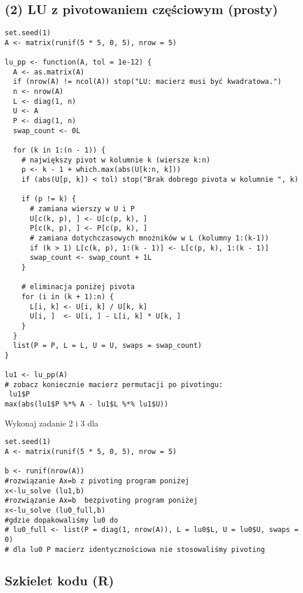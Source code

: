\documentclass[12pt]{article}
\begin{document}
\subsection*{(2) LU z pivotowaniem częściowym (prosty)}
\begin{lstlisting}
set.seed(1)
A <- matrix(runif(5 * 5, 0, 5), nrow = 5)

lu_pp <- function(A, tol = 1e-12) {
  A <- as.matrix(A)
  if (nrow(A) != ncol(A)) stop("LU: macierz musi być kwadratowa.")
  n <- nrow(A)
  L <- diag(1, n)
  U <- A
  P <- diag(1, n)
  swap_count <- 0L

  for (k in 1:(n - 1)) {
    # największy pivot w kolumnie k (wiersze k:n)
    p <- k - 1 + which.max(abs(U[k:n, k]))
    if (abs(U[p, k]) < tol) stop("Brak dobrego pivota w kolumnie ", k)

    if (p != k) {
      # zamiana wierszy w U i P
      U[c(k, p), ] <- U[c(p, k), ]
      P[c(k, p), ] <- P[c(p, k), ]
      # zamiana dotychczasowych mnożników w L (kolumny 1:(k-1))
      if (k > 1) L[c(k, p), 1:(k - 1)] <- L[c(p, k), 1:(k - 1)]
      swap_count <- swap_count + 1L
    }

    # eliminacja poniżej pivota
    for (i in (k + 1):n) {
      L[i, k] <- U[i, k] / U[k, k]
      U[i, ]  <- U[i, ] - L[i, k] * U[k, ]
    }
  }
  list(P = P, L = L, U = U, swaps = swap_count)
}

lu1 <- lu_pp(A)
# zobacz koniecznie macierz permutacji po pivotingu:
 lu1$P
max(abs(lu1$P %*% A - lu1$L %*% lu1$U))
\end{lstlisting}


Wykonaj zadanie 2 i 3 dla
\begin{lstlisting}
set.seed(1)
A <- matrix(runif(5 * 5, 0, 5), nrow = 5)

b <- runif(nrow(A))
#rozwiązanie Ax=b z pivoting program poniżej
x<-lu_solve (lu1,b)
#rozwiązanie Ax=b  bezpivoting program poniżej
x<-lu_solve (lu0_full,b) 
#gdzie dopakowaliśmy lu0 do 
# lu0_full <- list(P = diag(1, nrow(A)), L = lu0$L, U = lu0$U, swaps = 0)
# dla lu0 P macierz identycznościowa nie stosowaliśmy pivoting
\end{lstlisting}


\subsection*{Szkielet kodu (R)}
\end{document}
